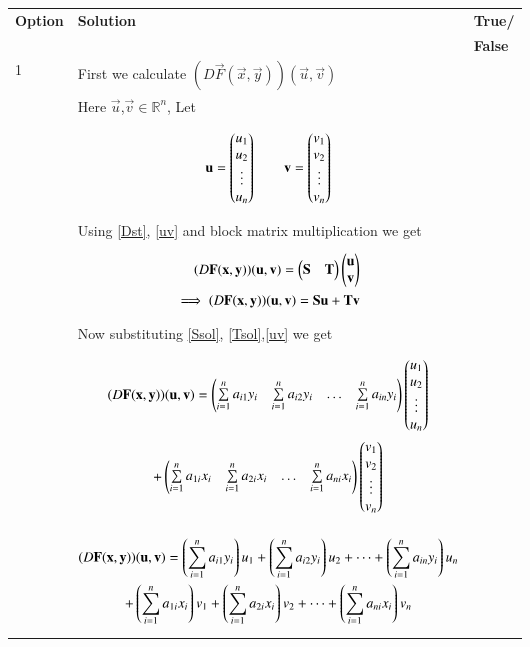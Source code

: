 \documentclass[journal,12pt]{IEEEtran}
\begin{document}
\begin{longtable}{|l|l|l|}
\hline
\endhead
\textbf{Option}&\textbf{Solution}&\textbf{True/}\\&&\textbf{False}\\
\hline
1&First we calculate $(D\vec{F}(\vec{x},\vec{y}))(\vec{u},\vec{v})$&\\&Here $\vec{u}$,$\vec{v}\in\mathbb{R}^n$, Let&\\&\parbox{14cm}{\begin{align}
    \mathbf{u}=\begin{pmatrix}u_1\\u_2\\\vdots\\u_n\end{pmatrix}\quad\quad\mathbf{v}=\begin{pmatrix}v_1\\v_2\\\vdots\\v_n\end{pmatrix}\label{uv}
\end{align}}&\\&Using \eqref{Dst}, \eqref{uv} and block matrix multiplication we get&\\&\parbox{14cm}{\begin{align}
    (D\mathbf{F}(\mathbf{x},\mathbf{y}))(\mathbf{u},\mathbf{v})=\begin{pmatrix}\mathbf{S}&\mathbf{T}\end{pmatrix}\begin{pmatrix}\mathbf{u}\\\mathbf{v}\end{pmatrix}\\
    \implies(D\mathbf{F}(\mathbf{x},\mathbf{y}))(\mathbf{u},\mathbf{v})=\mathbf{S}\mathbf{u}+\mathbf{T}\mathbf{v}\label{eq1}
\end{align}}&\\&Now substituting \eqref{Ssol}, \eqref{Tsol},\eqref{uv} we get&\\&\parbox{14cm}{\begin{multline}
    (D\mathbf{F}(\mathbf{x},\mathbf{y}))(\mathbf{u},\mathbf{v})=\begin{pmatrix}\sum\limits_{i=1}^na_{i1}y_i&\sum\limits_{i=1}^na_{i2}y_i&\dots&\sum\limits_{i=1}^na_{in}y_i\end{pmatrix}\begin{pmatrix}u_1\\u_2\\\vdots\\u_n\end{pmatrix}\\+\begin{pmatrix}\sum\limits_{i=1}^na_{1i}x_i&\sum\limits_{i=1}^na_{2i}x_i&\dots&\sum\limits_{i=1}^na_{ni}x_i\end{pmatrix}\begin{pmatrix}v_1\\v_2\\\vdots\\v_n\end{pmatrix}
\end{multline}}&\\&\parbox{14cm}{\begin{multline}
    (D\vec{F}(\vec{x},\vec{y}))(\vec{u},\vec{v})=\brak{\sum\limits_{i=1}^na_{i1}y_i}u_1+\brak{\sum\limits_{i=1}^na_{i2}y_i}u_2+\dots+\brak{\sum\limits_{i=1}^na_{in}y_i}u_n\\+\brak{\sum\limits_{i=1}^na_{1i}x_i}v_1+\brak{\sum\limits_{i=1}^na_{2i}x_i}v_2+\dots+\brak{\sum\limits_{i=1}^na_{ni}x_i}v_n\label{lhs}

\end{multline}}
\end{longtable}
\end{document}

